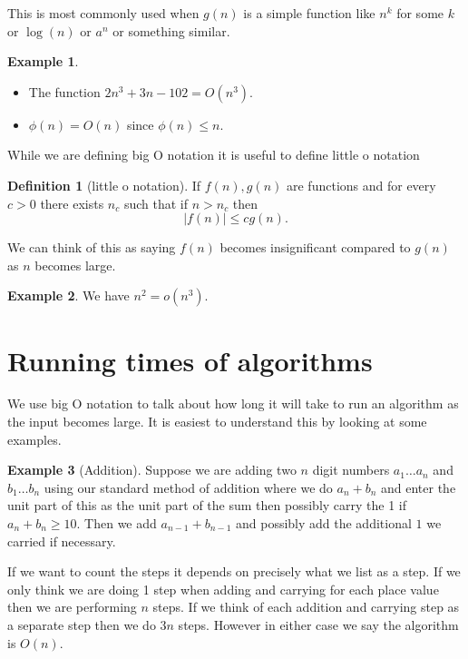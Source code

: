 \documentclass[
]{book}
\theoremstyle{definition}
\newtheorem{definition}{Definition}[chapter]
\theoremstyle{definition}
\newtheorem{example}{Example}[chapter]
\theoremstyle{definition}
\theoremstyle{definition}
\theoremstyle{remark}
\begin{document}
This is most commonly used when \(g(n)\) is a simple function like \(n^k\) for some \(k\) or \(\log(n)\) or \(a^n\) or something similar.

\begin{example}

\begin{itemize}
\item
  The function \(2n^3 + 3n - 102 = O(n^3)\).
\item
  \(\phi(n) = O(n)\) since \(\phi(n) \leq n\).
\end{itemize}

\end{example}

While we are defining big O notation it is useful to define little o notation

\begin{definition}[little o notation]
If \(f(n), g(n)\) are functions and for every \(c >0\) there exists \(n_c\) such that if \(n >n_c\) then
\[ |f(n)| \leq c g(n).\]

We can think of this as saying \(f(n)\) becomes insignificant compared to \(g(n)\) as \(n\) becomes large.
\end{definition}

\begin{example}
We have \(n^2 = o(n^3)\).
\end{example}

\section{Running times of algorithms}\label{running-times-of-algorithms}

We use big O notation to talk about how long it will take to run an algorithm as the input becomes large. It is easiest to understand this by looking at some examples.

\begin{example}[Addition]
Suppose we are adding two \(n\) digit numbers \(a_1\dots a_n\) and \(b_1\dots b_n\) using our standard method of addition where we do \(a_n+b_n\) and enter the unit part of this as the unit part of the sum then possibly carry the 1 if \(a_n + b_n \geq 10\). Then we add \(a_{n-1} + b_{n-1}\) and possibly add the additional \(1\) we carried if necessary.

If we want to count the steps it depends on precisely what we list as a step. If we only think we are doing 1 step when adding and carrying for each place value then we are performing \(n\) steps. If we think of each addition and carrying step as a separate step then we do \(3n\) steps. However in either case we say the algorithm is \(O(n)\).
\end{example}
\end{document}
